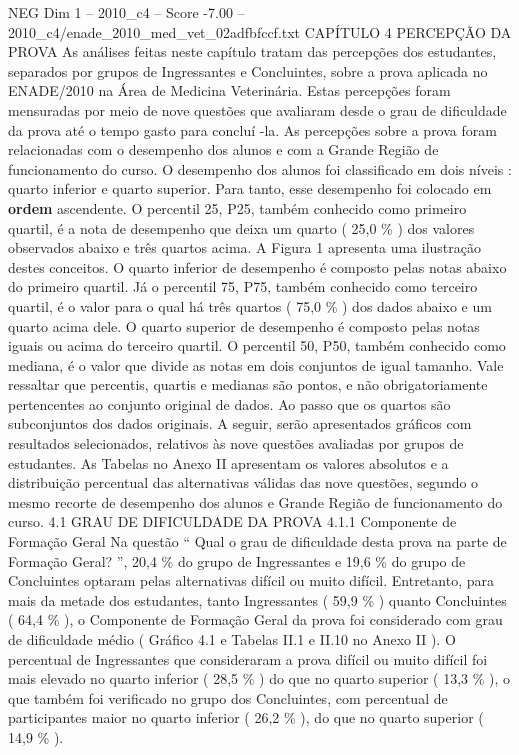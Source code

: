 \begin{textsample}{NEG Dim 1 – 2010\_c4 – Score -7.00 – 2010\_c4/enade\_2010\_med\_vet\_02adfbfccf.txt}  \label{ex:f1_neg_040}
CAPÍTULO 4 PERCEPÇÃO DA PROVA As análises feitas neste capítulo tratam das percepções dos estudantes, separados por grupos de Ingressantes e Concluintes, sobre a prova aplicada no ENADE/2010 na Área de Medicina Veterinária.
Estas percepções foram mensuradas por meio de nove questões que avaliaram desde o grau de dificuldade da prova até o tempo gasto para concluí -la.
As percepções sobre a prova foram relacionadas com o desempenho dos alunos e com a Grande Região de funcionamento do curso.
O desempenho dos alunos foi classificado em dois níveis : quarto inferior e quarto superior.
Para tanto, esse desempenho foi colocado em \textbf{ordem} ascendente.
O percentil 25, P25, também conhecido como primeiro quartil, é a nota de desempenho que deixa um quarto ( 25,0 \% ) dos valores observados abaixo e três quartos acima.
A Figura 1 apresenta uma ilustração destes conceitos.
O quarto inferior de desempenho é composto pelas notas abaixo do primeiro quartil.
Já o percentil 75, P75, também conhecido como terceiro quartil, é o valor para o qual há três quartos ( 75,0 \% ) dos dados abaixo e um quarto acima dele.
O quarto superior de desempenho é composto pelas notas iguais ou acima do terceiro quartil.
O percentil 50, P50, também conhecido como mediana, é o valor que divide as notas em dois conjuntos de igual tamanho.
Vale ressaltar que percentis, quartis e medianas são pontos, e não obrigatoriamente pertencentes ao conjunto original de dados.
Ao passo que os quartos são subconjuntos dos dados originais.
A seguir, serão apresentados gráficos com resultados selecionados, relativos às nove questões avaliadas por grupos de estudantes.
As Tabelas no Anexo II apresentam os valores absolutos e a distribuição percentual das alternativas válidas das nove questões, segundo o mesmo recorte de desempenho dos alunos e Grande Região de funcionamento do curso. 4.1 GRAU DE DIFICULDADE DA PROVA 4.1.1 Componente de Formação Geral Na questão “ Qual o grau de dificuldade desta prova na parte de Formação Geral? ”, 20,4 \% do grupo de Ingressantes e 19,6 \% do grupo de Concluintes optaram pelas alternativas difícil ou muito difícil.
Entretanto, para mais da metade dos estudantes, tanto Ingressantes ( 59,9 \% ) quanto Concluintes ( 64,4 \% ), o Componente de Formação Geral da prova foi considerado com grau de dificuldade médio ( Gráfico 4.1 e Tabelas II.1 e II.10 no Anexo II ).
O percentual de Ingressantes que consideraram a prova difícil ou muito difícil foi mais elevado no quarto inferior ( 28,5 \% ) do que no quarto superior ( 13,3 \% ), o que também foi verificado no grupo dos Concluintes, com percentual de participantes maior no quarto inferior ( 26,2 \% ), do que no quarto superior ( 14,9 \% ).

\end{textsample}
